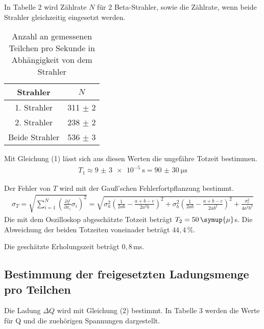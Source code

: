 In Tabelle 2 wird Zählrate $N$ für 2 Beta-Strahler, sowie die Zählrate, wenn beide Strahler gleichzeitig
eingesetzt werden.

\begin{table}[H]
  \centering
  \caption{Anzahl an gemessenen Teilchen pro Sekunde in Abhängigkeit von dem Strahler}
  \label{tab:Rechteckspannung}
  \begin{tabular}{c c}
    \toprule
    Strahler & $N$  \\
    \midrule
    1. Strahler & 311 $\pm$ 2 \\
    2. Strahler & 238 $\pm$ 2\\
    Beide Strahler & 536 $\pm$ 3\\
    \bottomrule
  \end{tabular}
\end{table}

Mit Gleichung (1) lässt sich aus diesen Werten die ungefähre Totzeit bestimmen.
\begin{align*}
  T_1 \approx \SI{9(3)e-5}{\second} = \SI{90(30)}{\micro\second}
\end{align*}

Der Fehler von $T$ wird mit der Gauß'schen Fehlerfortpflanzung bestimmt.
\begin{align*}
  \sigma_T = \sqrt{
      \sum\limits_{i = 1}^N
       \left( \frac{\partial f}{\partial x_i} \sigma_i \right)^{\!\! 2}
     }
    = \sqrt{\sigma_{a}^{2} \left(\frac{1}{2 a b} - \frac{a + b - c}{2 a^{2} b}\right)^{2}
  + \sigma_{b}^{2} \left(\frac{1}{2 a b} - \frac{a + b - c}{2 a b^{2}}\right)^{2} + \frac{\sigma_{c}^{2}}{4 a^{2} b^{2}}}
\end{align*}
Die mit dem Oszilloskop abgeschätzte Totzeit beträgt $T_2 = 50 \, \symup{\mu} $s.
Die Abweichung der beiden Totzeiten voneinader beträgt $44,4 \, \%$.

Die geschätzte Erholungszeit beträgt $0,8 \,$ms.


\subsection{Bestimmung der freigesetzten Ladungsmenge pro Teilchen}

Die Ladung $\Delta Q$ wird mit Gleichung (2) bestimmt. In Tabelle 3 werden die Werte für Q und die zuehörigen Spannungen dargestellt.

